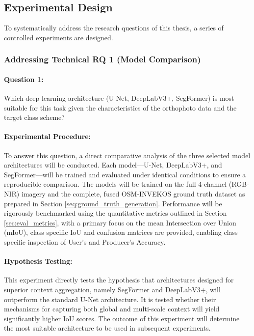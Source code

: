 \documentclass{report}
\begin{document}
\subsection{Experimental Design}
\label{sec:experimental_design}
To systematically address the research questions of this thesis, a series of controlled experiments are designed.

\subsubsection{Addressing Technical RQ 1 (Model Comparison)}

\label{sec:addressing_technical_rq1}
\paragraph{Question 1:} Which deep learning architecture (U-Net, DeepLabV3+, SegFormer) is most suitable for this task given the characteristics of the orthophoto data and the target class scheme?
\paragraph{Experimental Procedure:} To answer this question, a direct comparative analysis of the three selected model architectures will be conducted. Each model—U-Net, DeepLabV3+, and SegFormer—will be trained and evaluated under identical conditions to ensure a reproducible comparison. The models will be trained on the full 4-channel (RGB-NIR) imagery and the complete, fused OSM-INVEKOS ground truth dataset as prepared in Section \ref{seq:ground_truth_generation}. Performance will be rigorously benchmarked using the quantitative metrics outlined in Section \ref{sec:eval_metrics}, with a primary focus on the mean Intersection over Union (mIoU), class specific IoU and confusion matrices are provided, enabling class specific inspection of User's and Producer's Accuracy.
\paragraph{Hypothesis Testing:} This experiment directly tests the hypothesis that architectures designed for superior context aggregation, namely SegFormer and DeepLabV3+, will outperform the standard U-Net architecture. It is tested whether their mechanisms for capturing both global and multi-scale context \parencite[p.~8f.]{SertelEtAlLandUseLandCoverMappingUsingDeepLearningBasedSegmentationApproachesVHRWorldview3Images2022} will yield significantly higher IoU scores. The outcome of this experiment will determine the most suitable architecture to be used in subsequent experiments.
\end{document}
